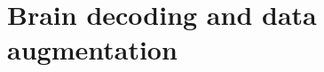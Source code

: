 \documentclass{report}
\newtheorem{prop}{Prop.}
\begin{document}

\chapter{Brain decoding and data augmentation}
\end{document}
